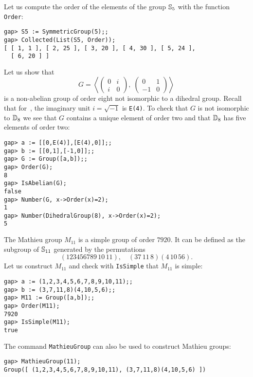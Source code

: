\begin{example}
Let us compute the order of the elements of the group 
$\mathbb{S}_5$ with the function \lstinline{Order}:
\begin{lstlisting}
gap> S5 := SymmetricGroup(5);;
gap> Collected(List(S5, Order));
[ [ 1, 1 ], [ 2, 25 ], [ 3, 20 ], [ 4, 30 ], [ 5, 24 ],
  [ 6, 20 ] ]
\end{lstlisting}
\end{example}

\begin{example}
Let us show that 
	\[
	G=\left\langle 
	\begin{pmatrix}
		0 & i\\
		i & 0
	\end{pmatrix}
	,\;
	\begin{pmatrix}
		0 & 1\\
		-1 & 0
	\end{pmatrix}\right\rangle
	\]
is a non-abelian group of order eight not isomorphic to a dihedral group.
Recall that for~\GAP, the imaginary unit $i=\sqrt{-1}$ is \lstinline{E(4)}. To
check that $G$ is not isomorphic to $\mathbb{D}_8$ we see that $G$ contains a unique element of order
two and that $\mathbb{D}_8$ has five elements of order two: 
\begin{lstlisting}
gap> a := [[0,E(4)],[E(4),0]];;
gap> b := [[0,1],[-1,0]];;
gap> G := Group([a,b]);;
gap> Order(G);
8
gap> IsAbelian(G);
false
gap> Number(G, x->Order(x)=2);
1
gap> Number(DihedralGroup(8), x->Order(x)=2);
5
\end{lstlisting} 
\end{example}

\begin{example}
The Mathieu group $M_{11}$ is a simple group of order $7920$. It can be defined as 
the subgroup of $\mathbb{S}_{11}$ generated by the permutations
\[
(123456789\,10\,11),\quad
(37\,11\,8)(4\,10\,56).
\]
Let us construct $M_{11}$ and check with \lstinline{IsSimple} that $M_{11}$ is
simple: 
\begin{lstlisting}
gap> a := (1,2,3,4,5,6,7,8,9,10,11);;
gap> b := (3,7,11,8)(4,10,5,6);;
gap> M11 := Group([a,b]);;
gap> Order(M11);
7920
gap> IsSimple(M11);
true
\end{lstlisting}
The command \lstinline{MathieuGroup} can also be used to construct Mathieu groups:
\begin{lstlisting}
gap> MathieuGroup(11);
Group([ (1,2,3,4,5,6,7,8,9,10,11), (3,7,11,8)(4,10,5,6) ])
\end{lstlisting}
\end{example}

